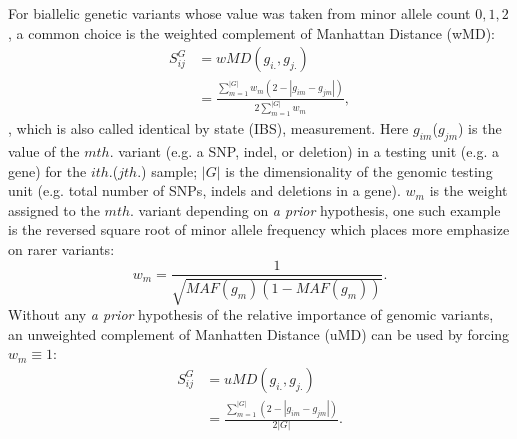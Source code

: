 For biallelic genetic variants whose value was taken from minor allele count ${0, 1, 2}$, a common choice is the weighted complement of Manhattan Distance (wMD):
\begin{equation} \label{eq:wSG}
\begin{split}
  S_{ij}^G &= wMD(g_{i.},g_{j.}) \\
  &= \frac{\sum_{m=1}^{|G|}{w_m(2-|g_{im}-g_{jm}|)}} {2\sum_{m=1}^{|G|}{w_m}},
\end{split}
\end{equation}
, which is also called identical by state (IBS), measurement. Here $g_{im}$($g_{jm}$) is the value of the $m th.$ variant (e.g. a SNP, indel, or deletion) in a testing unit (e.g. a gene) for the $i th.$($j th.$) sample; $|G|$ is the dimensionality of the genomic testing unit (e.g. total number of SNPs, indels and deletions in a gene). $w_m$ is the weight assigned to the $m th.$ variant depending on \textit{a prior} hypothesis, one such example is the reversed square root of minor allele frequency which places more emphasize on rarer variants:
\begin{displaymath}w_m=\frac{1}{\sqrt{MAF(g_m)(1-MAF(g_m))}}.\end{displaymath}
Without any \textit{a prior} hypothesis of the relative importance of genomic variants, an unweighted complement of Manhatten Distance (uMD) can be used by forcing $w_m \equiv 1$:
\begin{equation*} \label{eq:uSG}
\begin{split}
  S_{ij}^G &= uMD(g_{i.}, g_{j.}) \\
  &= \frac{\sum_{m = 1}^{|G|}{(2-|g_{im} - g_{jm}|)}}  {2|G|}.
\end{split}
\end{equation*}

